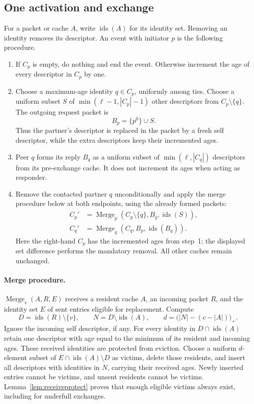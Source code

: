 \documentclass[11pt]{article}
\begin{document}
\subsection{One activation and exchange}
For a packet or cache $A$, write $\operatorname{ids}(A)$ for
its identity set. Removing an identity removes its descriptor.
An event with initiator $p$ is the following procedure.
\begin{enumerate}
\item If $C_p$ is empty, do nothing and end the event.
Otherwise increment the age of every descriptor in $C_p$ by one.
\item Choose a maximum-age identity $q\in C_p$, uniformly among
ties. Choose a uniform subset $S$ of
$\min(\ell-1,|C_p|-1)$ other descriptors from $C_p\setminus\{q\}$.
The outgoing request packet is
\[
 B_p=\{p^0\}\cup S.
\]
Thus the partner's descriptor is replaced in the packet by a
fresh self descriptor, while the extra descriptors keep their
incremented ages.
\item Peer $q$ forms its reply $B_q$ as a uniform subset of
$\min(\ell,|C_q|)$ descriptors from its pre-exchange cache.
It does not increment its ages when acting as responder.
\item Remove the contacted partner $q$ unconditionally and
apply the merge procedure below at both endpoints, using the
already formed packets:
\[
\begin{split}
 C_p'&=\operatorname{Merge}_p
       (C_p\setminus\{q\},B_q,\operatorname{ids}(S)),\\
 C_q'&=\operatorname{Merge}_q
       (C_q,B_p,\operatorname{ids}(B_q)).
\end{split}
\]
Here the right-hand $C_p$ has the incremented ages from step~1;
the displayed set difference performs the mandatory removal.
All other caches
remain unchanged.
\end{enumerate}

\paragraph{Merge procedure.}
$\operatorname{Merge}_v(A,R,E)$ receives a resident cache $A$,
an incoming packet $R$, and the identity set $E$ of sent entries
eligible for replacement. Compute
\[
 D=\operatorname{ids}(R)\setminus\{v\},\qquad
 N=D\setminus\operatorname{ids}(A),\qquad
 d=\bigl(|N|-(c-|A|)\bigr)_+ .
\]
Ignore the incoming self descriptor, if any. For every identity
in $D\cap\operatorname{ids}(A)$ retain one descriptor with
age equal to the minimum of its resident and incoming ages.
These received identities are protected from eviction.
Choose a uniform $d$-element subset of
$E\cap\operatorname{ids}(A)\setminus D$ as victims, delete
those residents, and insert all descriptors with identities
in $N$, carrying their received ages. Newly inserted entries
cannot be victims, and unsent residents cannot be victims.
Lemma~\ref{lem:receiveprotect} proves that enough eligible
victims always exist, including for underfull exchanges.
\end{document}
